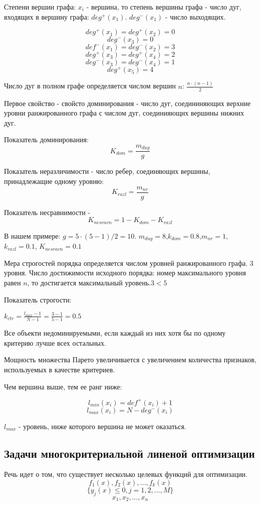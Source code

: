 \documentclass[aps,%
12pt,%
final,%
oneside,
onecolumn,%
musixtex, %
superscriptaddress,%
centertags]{article} %
\begin{document}
Степени вершин графа: $x_i$ - вершина, то степень вершины графа - число дуг, входящих в вершину графа: $deg^+(x_1)$. $deg^-(x_1)$ - число выходящих.

$$deg^+(x_1) = deg^+(x_2) = 0$$
$$deg^-(x_3)=0$$
$$def^-(x_1) = deg^-(x_2) = 3$$
$$deg^+(x_3) = deg^+(x_4) = 2$$
$$deg^-(x_3) = deg^-(x_4) = 1$$
$$deg^+(x_5) = 4$$

Число дуг в полном графе определяется числом вершин $n$: $\frac{n \cdot (n-1)}{2} $

Первое свойство - свойсто доминирования - число дуг, соедининяющих верхние уровни ранжированного графа с числом дуг, соединияющих вершины нижних дуг.

Показатель доминирования: 
$$ K_{dom} = \frac{m_{dug}}{g}$$

Показатель неразличимости  - число ребер, соединяющих вершины, принадлежащие одному уровню:
$$ K_{razl} = \frac{m_{nr}}{g}$$

Показатель несравнимости - 
$$ K_{nesravn} = 1 - K_{dom} - K_{razl}$$

В нашем примере: $g = 5 \cdot (5-1) /2 = 10$.  $m_{dug} = 8$,$k_{dom} =0.8$,$m_{nr} = 1$,$k_{razl} =0.1$, $ K_{nesravn} = 0.1$

Мера строгостей порядка определяется числом уровней ранжированного графа. 3 уровня.
Число достижимости исходного порядка: номер максимального уровня равен $n$, то достигается максимальный уровень.$3<5$

Показатель строгости:

$k_{ctr} = \frac{l_{max}-1}{N-1} = \frac{3-1}{5-1} = 0.5$

Все объекти недоминируемыми, если каждый из них хотя бы по одному критерию лучше всех остальных.

Мощность множества Парето увеличивается с увеличением количества признаков, используемых в качестве критериев.

Чем вершина выше, тем ее ранг ниже:

$$l_{min}(x_i) = def^+(x_i) + 1$$
$$l_{max}(x_i) =N -  deg^-(x_i)$$ 

$l_{max}$ - уровень, ниже которого вершина не может оказаться.

\subsection{Задачи многокритериальной линеной оптимизации}

Речь идет о том, что существует несколько целевых функций для оптимизации.
$$f_1(x),f_2(x),\ldots,f_k(x)$$
$$\{y_j(x) \leq 0, j = 1,2,\ldots,M\}$$
$$x_1,x_2,\ldots,x_n$$
\end{document}
